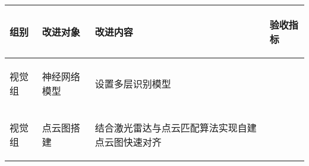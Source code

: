 
\begin{longtable}{ p{1.5cm} | p{3cm} | p{6cm} | p{4.3cm} |}

    \hline

    \endfoot
    
    \rowcolor{tabhdcolor}

        \begin{center}
            组别
        \end{center} &
        \begin{center}
            改进对象
        \end{center} &
        \begin{center}
            改进内容
        \end{center} &
        \begin{center}
            验收指标
        \end{center}\\

    \hline

    \endhead

        \begin{center}
            视觉组
        \end{center} &
        \begin{center}
            神经网络模型
        \end{center} &
        \begin{center}
            设置多层识别模型
        \end{center} &
        \begin{center}
            
        \end{center}\\
        
    \hline
        \begin{center}
            视觉组
        \end{center}&
        \begin{center}
            点云图搭建
        \end{center}&
        \begin{center}
            结合激光雷达与点云匹配算法实现自建点云图快速对齐
        \end{center}&
        \begin{center}
            

\end{center}
\end{longtable}
